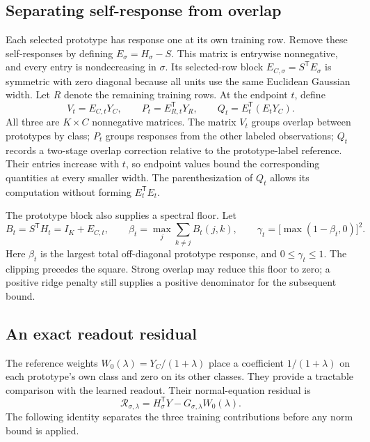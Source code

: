 \documentclass[preprint,12pt]{elsarticle}
\newcommand{\tr}{\mathsf{T}}
\begin{document}
\subsection{Separating self-response from overlap}
Each selected prototype has response one at its own training row. Remove these self-responses by defining $E_\sigma=H_\sigma-S$. This matrix is entrywise nonnegative, and every entry is nondecreasing in $\sigma$. Its selected-row block $E_{C,\sigma}=S^\tr E_\sigma$ is symmetric with zero diagonal because all units use the same Euclidean Gaussian width. Let $R$ denote the remaining training rows. At the endpoint $t$, define
\begin{equation}
 V_t=E_{C,t}Y_C,\qquad
 P_t=E_{R,t}^\tr Y_R,\qquad
 Q_t=E_t^\tr(E_tY_C).
 \label{eq:terms}
\end{equation}
All three are $K\times C$ nonnegative matrices. The matrix $V_t$ groups overlap between prototypes by class; $P_t$ groups responses from the other labeled observations; $Q_t$ records a two-stage overlap correction relative to the prototype-label reference. Their entries increase with $t$, so endpoint values bound the corresponding quantities at every smaller width. The parenthesization of $Q_t$ allows its computation without forming $E_t^\tr E_t$.

The prototype block also supplies a spectral floor. Let
\begin{equation}
 B_t=S^\tr H_t=I_K+E_{C,t},\qquad
 \beta_t=\max_j\sum_{k\ne j}B_t(j,k),\qquad
 \gamma_t=\bigl[\max(1-\beta_t,0)\bigr]^2.
 \label{eq:spectral}
\end{equation}
Here $\beta_t$ is the largest total off-diagonal prototype response, and $0\leq\gamma_t\leq1$. The clipping precedes the square. Strong overlap may reduce this floor to zero; a positive ridge penalty still supplies a positive denominator for the subsequent bound.

\subsection{An exact readout residual}
The reference weights $W_0(\lambda)=Y_C/(1+\lambda)$ place a coefficient $1/(1+\lambda)$ on each prototype's own class and zero on its other classes. They provide a tractable comparison with the learned readout. Their normal-equation residual is
\begin{equation}
 \mathcal R_{\sigma,\lambda}
 =H_\sigma^\tr Y-G_{\sigma,\lambda}W_0(\lambda).
 \label{eq:residualdef}
\end{equation}
The following identity separates the three training contributions before any norm bound is applied.
\end{document}
